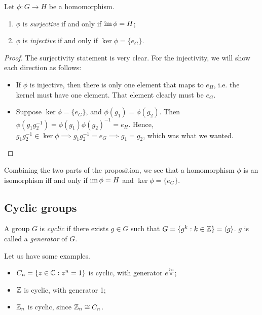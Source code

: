 \documentclass{../../template/note}
\begin{document}
    \begin{proposition}
        \label{surj-inv-crits}
        Let \(\phi: G \to H\) be a homomorphism.
        \begin{enumerate}
            \item \(\phi\) is \emph{surjective} if and only if \(\operatorname{im} \phi = H\);
            \item \(\phi\) is \emph{injective} if and only if \(\ker \phi = \{e_G\}\).
        \end{enumerate}
    \end{proposition}
    

    \begin{proof}
        The surjectivity statement is very clear. For the injectivity, we will show each direction as follows:
        \begin{itemize}
            \item[\(\implies\)] If \(\phi\) is injective, then there is only one element that maps to \(e_H\), i.e. the kernel must have one element. That element clearly must be \(e_G\).
            \item[\(\impliedby\)] Suppose \(\ker \phi = \{e_G\}\), and \(\phi(g_1) = \phi(g_2)\). Then \(\phi(g_1g_2^{-1}) = \phi(g_1)\phi(g_2)^{-1} = e_H\). Hence, \(g_1g_2^{-1} \in \ker \phi \implies g_1g_2^{-1} = e_G \implies g_1 = g_2\), which was what we wanted.
        \end{itemize}
    \end{proof}
    
    Combining the two parts of the proposition, we see that a homomorphism \(\phi\) is an isomorphism iff and only if \(\operatorname{im} \phi = H\) and \(\ker \phi = \{e_G\}\).

    \subsection{Cyclic groups}

    \begin{definition}
        A group \(G\) is \emph{cyclic} if there exists \(g \in G\) such that \(G = \{g^k: k \in \mathbb Z\} = \left \langle g \right \rangle\). \(g\) is called a \emph{generator} of \(G\).
    \end{definition}
    
    \begin{example*}
        Let us have some examples.
        \begin{itemize}
            \item \(C_n = \{z \in \mathbb C: z^n = 1\}\) is cyclic, with generator \(e^{\frac{2\pi i}n}\);
            \item \(\mathbb Z\) is cyclic, with generator 1;
            \item \(\mathbb Z_n\) is cyclic, since \(\mathbb Z_n \cong C_n\).
        \end{itemize}
    \end{example*}
    
\end{document}
